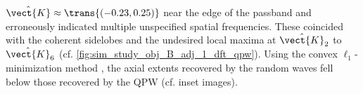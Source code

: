 $\hat{\vect{K}} \approx \trans{ ( -0.23, 0.25 ) }$ near
the edge of
the passband and erroneously indicated
multiple unspecified spatial frequencies.
These coincided with
the coherent sidelobes and
the undesired local maxima at
$\hat{\vect{K}}_{2}$ to
$\hat{\vect{K}}_{6}$
(cf. \cref{fig:sim_study_obj_B_adj_1_dft_qpw}).
Using
the convex $\ell_{1}$-minimization method
,
the axial extents recovered by
the random waves fell below
those recovered by
the \ac{QPW}
(cf. inset images).
